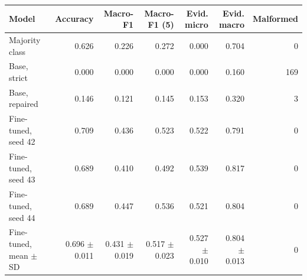 \begin{tabular}{lrrrrrr}
\toprule
Model & Accuracy & Macro-F1 & Macro-F1 (5) & Evid. micro & Evid. macro & Malformed \\
\midrule
Majority class & 0.626 & 0.226 & 0.272 & 0.000 & 0.704 & 0 \\
Base, strict & 0.000 & 0.000 & 0.000 & 0.000 & 0.160 & 169 \\
Base, repaired & 0.146 & 0.121 & 0.145 & 0.153 & 0.320 & 3 \\
Fine-tuned, seed 42 & 0.709 & 0.436 & 0.523 & 0.522 & 0.791 & 0 \\
Fine-tuned, seed 43 & 0.689 & 0.410 & 0.492 & 0.539 & 0.817 & 0 \\
Fine-tuned, seed 44 & 0.689 & 0.447 & 0.536 & 0.521 & 0.804 & 0 \\
Fine-tuned, mean $\pm$ SD & 0.696 $\pm$ 0.011 & 0.431 $\pm$ 0.019 & 0.517 $\pm$ 0.023 & 0.527 $\pm$ 0.010 & 0.804 $\pm$ 0.013 & 0 \\
\bottomrule
\end{tabular}
